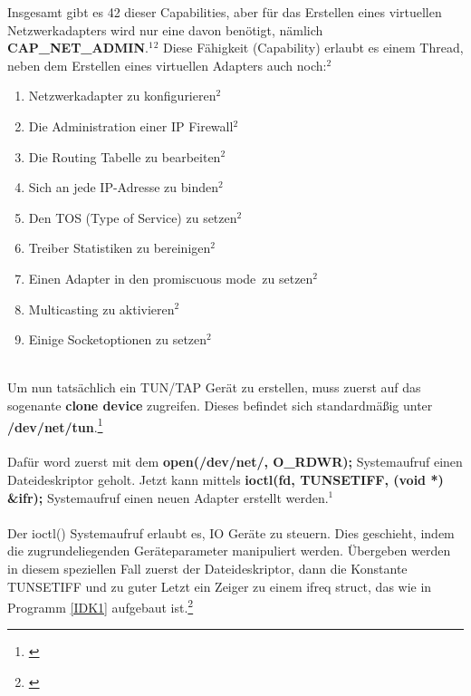 Insgesamt gibt es 42 dieser Capabilities, aber für das Erstellen eines virtuellen Netzwerkadapters wird nur eine davon benötigt, nämlich \textbf{CAP\_NET\_ADMIN}.$^{1}$$^{2}$ Diese Fähigkeit (Capability) erlaubt es einem Thread, neben dem Erstellen eines virtuellen Adapters auch noch:$^{2}$
\\
\begin{enumerate}
    \item Netzwerkadapter zu konfigurieren$^{2}$
    \item Die Administration einer IP Firewall$^{2}$
    \item Die Routing Tabelle zu bearbeiten$^{2}$
    \item Sich an jede IP-Adresse zu binden$^{2}$
    \item Den TOS (Type of Service) zu setzen$^{2}$
    \item Treiber Statistiken zu bereinigen$^{2}$
    \item Einen Adapter in den \dq promiscuous mode\dq \ zu setzen$^{2}$
    \item Multicasting zu aktivieren$^{2}$
    \item Einige Socketoptionen zu setzen$^{2}$
\end{enumerate} 
\ \\
\newpage
\noindent
Um nun tatsächlich ein TUN/TAP Gerät zu erstellen, muss zuerst auf das sogenante \textbf{clone device} zugreifen. Dieses befindet sich standardmäßig unter \textbf{/dev/net/tun}.\footnote[1]{\cite[Vgl.][]{TUNTAP}}
\\\\
Dafür word zuerst mit dem \textbf{open(\dq/dev/net/\dq, O\_RDWR);} Systemaufruf einen Dateideskriptor geholt. Jetzt kann mittels \textbf{ioctl(fd, TUNSETIFF, (void *) \&ifr);} Systemaufruf einen neuen Adapter erstellt werden.$^{1}$
\\\\
Der ioctl() Systemaufruf erlaubt es, IO Geräte zu steuern. Dies geschieht, indem die zugrundeliegenden Geräteparameter manipuliert werden. Übergeben werden in diesem speziellen Fall zuerst der Dateideskriptor, dann die Konstante TUNSETIFF und zu guter Letzt ein Zeiger zu einem ifreq struct, das wie in Programm \ref{IDK1} aufgebaut ist.\footnote[2]{\cite[Vgl.][]{SRV9}}

